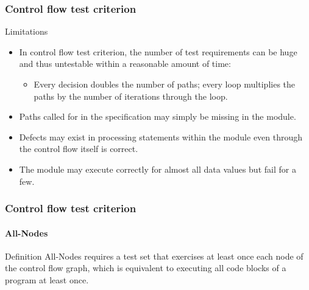 \begin{frame}
\frametitle{Control flow test criterion}

\begin{block:fact}{Limitations}
\begin{itemize}
	\item In control flow test criterion, the number of test requirements
	can be huge and thus untestable within a reasonable amount of time:
	\begin{itemize}
		\item Every decision doubles the number of paths; every loop multiplies
		the paths by the number of iterations through the loop.
	\end{itemize}

	\item Paths called for in the specification may simply be missing in the
	module.

    \item Defects may exist in processing statements within the module even
	through the control flow itself is correct.

    \item The module may execute correctly for almost all data values but fail
	for a few.
\end{itemize}
\end{block:fact}
\end{frame}



\begin{frame}
\label{concept:all-nodes-criterion}
\label{concept:all-nodes}
\frametitle{Control flow test criterion}
\framesubtitle{All-Nodes}

\begin{block:concept}{Definition}
All-Nodes requires a test set that exercises at least once each node of the
control flow graph, which is equivalent to executing all code blocks of a
program at least once.
\end{block:concept}

\hfill
{}
\end{frame}


